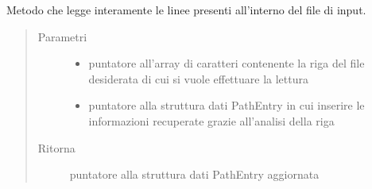 \documentclass[letterpaper,10pt,italian,openany,oneside]{sphinxmanual}
\begin{document}
\begin{fulllineitems}
\label{\detokenize{documentazione:c.inputLineAnalisis}}
Metodo che legge interamente le linee presenti all’interno del file di input.
\begin{quote}\begin{description}
\item[{Parametri}] \leavevmode\begin{itemize}
\item {} 
 \textendash{} puntatore all’array di caratteri contenente la riga del file desiderata di cui si vuole effettuare la lettura

\item {} 
 \textendash{} puntatore alla struttura dati PathEntry in cui inserire le informazioni recuperate grazie all’analisi della riga

\end{itemize}

\item[{Ritorna}] \leavevmode
puntatore alla struttura dati PathEntry aggiornata

\end{description}\end{quote}

\end{fulllineitems}

\end{document}

